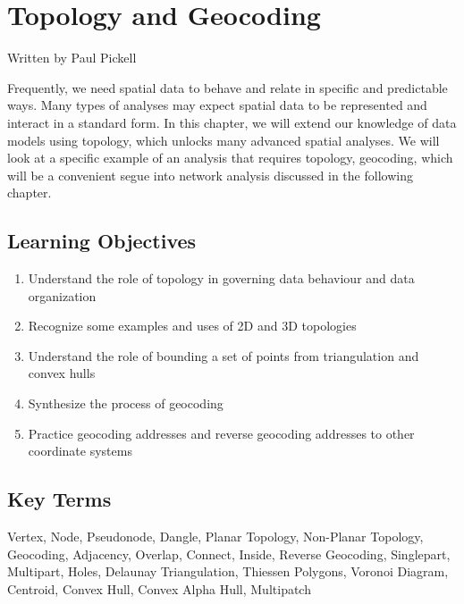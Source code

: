 \documentclass[
]{book}
\providecommand{\tightlist}{%
  \setlength{\itemsep}{0pt}\setlength{\parskip}{0pt}}
\begin{document}
\hypertarget{topology-and-geocoding}{%
\chapter{Topology and Geocoding}\label{topology-and-geocoding}}

Written by
Paul Pickell

Frequently, we need spatial data to behave and relate in specific and predictable ways. Many types of analyses may expect spatial data to be represented and interact in a standard form. In this chapter, we will extend our knowledge of data models using topology, which unlocks many advanced spatial analyses. We will look at a specific example of an analysis that requires topology, geocoding, which will be a convenient segue into network analysis discussed in the following chapter.

\hypertarget{learning-objectives-6}{%
\section*{Learning Objectives}\label{learning-objectives-6}}

\begin{enumerate}
\def\labelenumi{\arabic{enumi}.}
\tightlist
\item
  Understand the role of topology in governing data behaviour and data organization
\item
  Recognize some examples and uses of 2D and 3D topologies
\item
  Understand the role of bounding a set of points from triangulation and convex hulls
\item
  Synthesize the process of geocoding
\item
  Practice geocoding addresses and reverse geocoding addresses to other coordinate systems
\end{enumerate}

\hypertarget{key-terms-6}{%
\section*{Key Terms}\label{key-terms-6}}

Vertex, Node, Pseudonode, Dangle, Planar Topology, Non-Planar Topology, Geocoding, Adjacency, Overlap, Connect, Inside, Reverse Geocoding, Singlepart, Multipart, Holes, Delaunay Triangulation, Thiessen Polygons, Voronoi Diagram, Centroid, Convex Hull, Convex Alpha Hull, Multipatch
\end{document}
